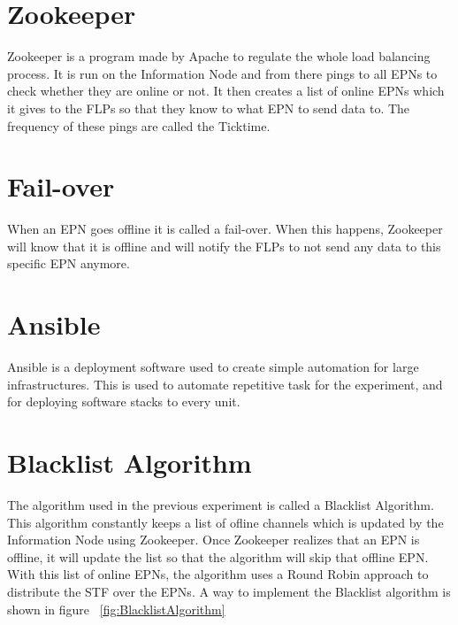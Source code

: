 \section{Zookeeper}
Zookeeper is a program made by Apache to regulate the whole load balancing process. It is run on the Information Node and from there pings to all EPNs to check whether they are online or not. It then creates a list of online EPNs which it gives to the FLPs so that they know to what EPN to send data to. The frequency of these pings are called the Ticktime. 

\section{Fail-over}
When an EPN goes offline it is called a fail-over. When this happens, Zookeeper will know that it is offline and will notify the FLPs to not send any data to this specific EPN anymore. 

\section{Ansible}
Ansible is a deployment software used to create simple automation for large infrastructures. This is used to automate repetitive task for the experiment, and for deploying software stacks to every unit. 

\section{Blacklist Algorithm}
The algorithm used in the previous experiment is called a Blacklist Algorithm. This algorithm constantly keeps a list of ofline channels which is updated by the Information Node using Zookeeper. Once Zookeeper realizes that an EPN is offline, it will update the list so that the algorithm will skip that offline EPN. With this list of online EPNs, the algorithm uses a Round Robin approach to distribute the STF over the EPNs. A way to implement the Blacklist algorithm is shown in figure ~\ref{fig:BlacklistAlgorithm}

